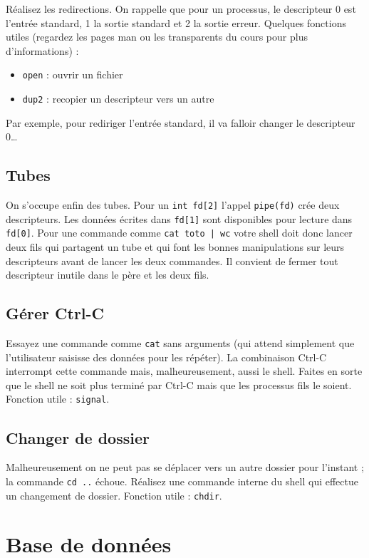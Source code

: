 \documentclass[11pt]{article}
\begin{document}
Réalisez les redirections. On rappelle que pour un processus,
le descripteur 0 est l'entrée standard, 1 la sortie standard
et 2 la sortie erreur. Quelques fonctions utiles (regardez les
pages man ou les transparents du cours pour plus d'informations) :
\begin{itemize}
\item \verb+open+ : ouvrir un fichier
\item \verb+dup2+ : recopier un descripteur vers un autre
\end{itemize}
Par exemple, pour rediriger l'entrée standard, il va falloir changer le
descripteur 0\ldots

\subsection{Tubes}

On s'occupe enfin des tubes. Pour un \verb+int fd[2]+ l'appel \verb+pipe(fd)+
crée deux descripteurs. Les données écrites dans \verb+fd[1]+ sont disponibles
pour lecture dans \verb+fd[0]+. Pour une commande comme \verb+cat toto | wc+
votre shell doit donc lancer deux fils qui partagent un tube et qui font
les bonnes manipulations sur leurs descripteurs avant de lancer les deux 
commandes. Il convient de fermer tout descripteur inutile dans le père
et les deux fils.

\subsection{Gérer Ctrl-C}

Essayez une commande comme \verb+cat+ sans arguments (qui attend simplement
que l'utilisateur saisisse des données pour les répéter). La combinaison
Ctrl-C interrompt cette commande mais, malheureusement, aussi le shell.
Faites en sorte que le shell ne soit plus terminé par Ctrl-C mais que
les processus fils le soient. Fonction utile : \texttt{signal}.

\subsection{Changer de dossier}

Malheureusement on ne peut pas se déplacer vers un autre dossier pour l'instant ;
la commande \verb+cd ..+ échoue. Réalisez une commande interne du shell
qui effectue un changement de dossier. Fonction utile : \texttt{chdir}.

\section{Base de données}
\end{document}
